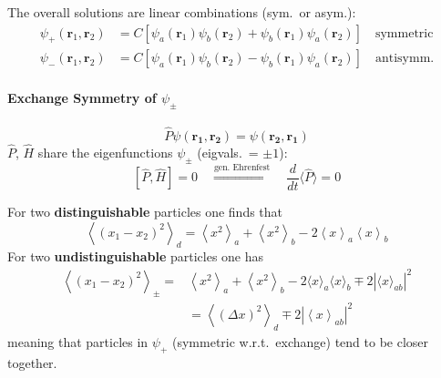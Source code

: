 The overall solutions are linear combinations (sym.\ or asym.):
\begin{align*}
    \psi_{+}(\mathbf{r}_{1},\mathbf{r}_{2}) & =C\left[\psi_{a}(\mathbf{r}_{1})\psi_{b}(\mathbf{r}_{2})+\psi_{b}(\mathbf{r}_{1})\psi_{a}(\mathbf{r}_{2})\right]\quad \mathrm{symmetric} \\
    \psi_{-}(\mathbf{r}_{1},\mathbf{r}_{2}) & =C\left[\psi_{a}(\mathbf{r}_{1})\psi_{b}(\mathbf{r}_{2})-\psi_{b}(\mathbf{r}_{1})\psi_{a}(\mathbf{r}_{2})\right]\quad \mathrm{antisymm.}
\end{align*}

\paragraph[Exchange Symmetry]{Exchange Symmetry of $\psi_\pm$}

\begin{equation*}
    \widehat{P}\psi(\mathbf{r_1},\mathbf{r_2})=\psi(\mathbf{r_2},\mathbf{r_1})
\end{equation*}
$\widehat{P}$, $\widehat{H}$ share the eigenfunctions $\psi_{\pm}$ (eigvals.\ = $\pm 1$):
\begin{equation*}
    \left[\widehat{P},\widehat{H}\right]=0 \quad \overset{\text{gen. Ehrenfest}}{\Rightarrow} \quad
    \frac{d}{dt}\langle\widehat{P}\rangle=0
\end{equation*}

For two \textbf{distinguishable} particles one finds that
\begin{equation*}
    \left\langle{\left(x_{1}-x_{2}\right)}^{2}\right\rangle_{d}=\left\langle x^{2}\right\rangle_{a}+\left\langle x^{2}\right\rangle_{b}-2\left\langle x\right\rangle_{a}\left\langle x\right\rangle_{b}
\end{equation*}
For two \textbf{undistinguishable} particles one has
\begin{align*}
    \left\langle{\left(x_{1}-x_{2}\right)}^{2}\right\rangle_{\pm}= & \left\langle x^{2}\right\rangle_{a}+\left\langle x^{2}\right\rangle_{b}-2\langle x\rangle_{a}\langle x\rangle_{b}\mp2|\langle x\rangle_{ab}|^{2} \\
                                                                   & =\left\langle{\left(\Delta x\right)}^{2}\right\rangle_{d}\mp2\left|\left\langle x\right\rangle_{ab}\right|^{2}
\end{align*}
meaning that particles in $\psi_{+}$ (symmetric w.r.t.\ exchange) tend to be closer together.


